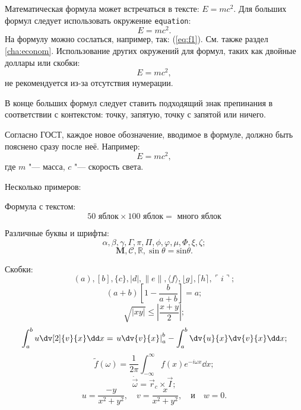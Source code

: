 Математическая формула может встречаться в тексте: $E = mc^2$. Для больших формул следует использовать окружение \verb|equation|:
\begin{equation}\label{eq:f1}
    E = mc^2.
\end{equation}
На формулу можно сослаться, например, так: (\ref{eq:f1}). См. также раздел \ref{cha:econom}. Использование других окружений для формул, таких как двойные доллары или скобки:
\[
    E = mc^2,
\]
не рекомендуется из-за отсутствия нумерации.

В конце больших формул следует ставить подходящий знак препинания в соответствии с контекстом: точку, запятую, точку с запятой или ничего.

Согласно ГОСТ, каждое новое обозначение, вводимое в формуле, должно быть пояснено сразу после неё. Например:
\begin{equation}
    E = mc^2,
\end{equation}
где $m$ "--- масса, $c$ "--- скорость света.

Несколько примеров:

Формула с текстом:
\begin{equation}
    50 \text{ яблок} \times 100 \text{ яблок} =
    \textbf{ много яблок}
\end{equation}

Различные буквы и шрифты:
\begin{equation}
    \alpha,  \beta,  \gamma, \Gamma, \pi, \Pi, \phi, \varphi, \mu, \Phi, \xi, \zeta;
\end{equation}
\begin{equation}
    \mathbf M, \mathcal C, \mathbb R, \sin \theta = \mathrm{sin} \theta.
\end{equation}

Скобки:
\begin{equation}
    ( a ), [ b ], \{ c \}, | d |, \| e \|, \langle f \rangle, \lfloor g \rfloor, \lceil h \rceil, \ulcorner i \urcorner;
\end{equation}
\begin{equation}
    \left( a + b \right) \left[ 1 - \frac{b}{a+b} \right] = a;
\end{equation}
\begin{equation}
    \sqrt{|xy|} \leq \left| \frac{x + y}{2} \right|;
\end{equation}
\begin{equation}
    \int_a^b u \dv[2]{v}{x} \dd x = \left. u \dv{v}{x} \right|_a^b -\int_a^b \dv{u}{x} \dv{v}{x} \dd x;
\end{equation}
\begin{equation}
    \tilde f(\omega) = \frac{1}{2\pi} \int_{-\infty}^\infty f(x)e^{-i\omega x} \dd x;
\end{equation}
\begin{equation}
    \dot{\vec \omega} = \vec r_c \times \vec I;
\end{equation}
\begin{equation}
    u = \frac{-y}{x^2 + y^2}, \quad v = \frac{x}{x^2 + y^2}, \quad \text{и} \quad w = 0.
\end{equation}

